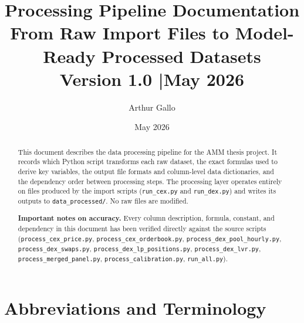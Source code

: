 \documentclass[11pt,a4paper]{article}
\title{\textbf{Processing Pipeline Documentation}\\
\large From Raw Import Files to Model-Ready Processed Datasets\\[4pt]
\normalsize Version 1.0 \quad|\quad May 2026}
\author{Arthur Gallo}
\date{May 2026}
\begin{document}
\maketitle
\thispagestyle{fancy}

\begin{abstract}
This document describes the data processing pipeline for the AMM thesis
project. It records which Python script transforms each raw dataset,
the exact formulas used to derive key variables, the output file formats
and column-level data dictionaries, and the dependency order between
processing steps. The processing layer operates entirely on files
produced by the import scripts (\texttt{run\_cex.py} and
\texttt{run\_dex.py}) and writes its outputs to
\texttt{data\_processed/}. No raw files are modified.

\medskip
\noindent\textbf{Important notes on accuracy.}
Every column description, formula, constant, and dependency in this
document has been verified directly against the source scripts
(\texttt{process\_cex\_price.py},
\texttt{process\_cex\_orderbook.py},
\texttt{process\_dex\_pool\_hourly.py},
\texttt{process\_dex\_swaps.py},
\texttt{process\_dex\_lp\_positions.py},
\texttt{process\_dex\_lvr.py},
\texttt{process\_merged\_panel.py},
\texttt{process\_calibration.py},
\texttt{run\_all.py}).
\end{abstract}

\tableofcontents
\newpage

\section{Abbreviations and Terminology}
\label{sec:glossary}
\end{document}
